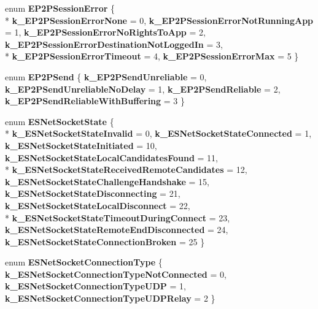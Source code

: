 \begin{DoxyCompactItemize}
\item 
\hypertarget{namespaceValve_1_1Steamworks_a993c473f27d237706a0af622b39f6b25}{}enum {\bfseries E\+P2\+P\+Session\+Error} \{ \\*
{\bfseries k\+\_\+\+E\+P2\+P\+Session\+Error\+None} = 0, 
{\bfseries k\+\_\+\+E\+P2\+P\+Session\+Error\+Not\+Running\+App} = 1, 
{\bfseries k\+\_\+\+E\+P2\+P\+Session\+Error\+No\+Rights\+To\+App} = 2, 
{\bfseries k\+\_\+\+E\+P2\+P\+Session\+Error\+Destination\+Not\+Logged\+In} = 3, 
\\*
{\bfseries k\+\_\+\+E\+P2\+P\+Session\+Error\+Timeout} = 4, 
{\bfseries k\+\_\+\+E\+P2\+P\+Session\+Error\+Max} = 5
 \}\label{namespaceValve_1_1Steamworks_a993c473f27d237706a0af622b39f6b25}

\item 
\hypertarget{namespaceValve_1_1Steamworks_afaf52a3fe3edfcee923d94dedba17814}{}enum {\bfseries E\+P2\+P\+Send} \{ {\bfseries k\+\_\+\+E\+P2\+P\+Send\+Unreliable} = 0, 
{\bfseries k\+\_\+\+E\+P2\+P\+Send\+Unreliable\+No\+Delay} = 1, 
{\bfseries k\+\_\+\+E\+P2\+P\+Send\+Reliable} = 2, 
{\bfseries k\+\_\+\+E\+P2\+P\+Send\+Reliable\+With\+Buffering} = 3
 \}\label{namespaceValve_1_1Steamworks_afaf52a3fe3edfcee923d94dedba17814}

\item 
\hypertarget{namespaceValve_1_1Steamworks_af62412d4d3fdfebc402e5dd992497d51}{}enum {\bfseries E\+S\+Net\+Socket\+State} \{ \\*
{\bfseries k\+\_\+\+E\+S\+Net\+Socket\+State\+Invalid} = 0, 
{\bfseries k\+\_\+\+E\+S\+Net\+Socket\+State\+Connected} = 1, 
{\bfseries k\+\_\+\+E\+S\+Net\+Socket\+State\+Initiated} = 10, 
{\bfseries k\+\_\+\+E\+S\+Net\+Socket\+State\+Local\+Candidates\+Found} = 11, 
\\*
{\bfseries k\+\_\+\+E\+S\+Net\+Socket\+State\+Received\+Remote\+Candidates} = 12, 
{\bfseries k\+\_\+\+E\+S\+Net\+Socket\+State\+Challenge\+Handshake} = 15, 
{\bfseries k\+\_\+\+E\+S\+Net\+Socket\+State\+Disconnecting} = 21, 
{\bfseries k\+\_\+\+E\+S\+Net\+Socket\+State\+Local\+Disconnect} = 22, 
\\*
{\bfseries k\+\_\+\+E\+S\+Net\+Socket\+State\+Timeout\+During\+Connect} = 23, 
{\bfseries k\+\_\+\+E\+S\+Net\+Socket\+State\+Remote\+End\+Disconnected} = 24, 
{\bfseries k\+\_\+\+E\+S\+Net\+Socket\+State\+Connection\+Broken} = 25
 \}\label{namespaceValve_1_1Steamworks_af62412d4d3fdfebc402e5dd992497d51}

\item 
\hypertarget{namespaceValve_1_1Steamworks_ab4b13623fc1bd48b8e9dcfae3fc35109}{}enum {\bfseries E\+S\+Net\+Socket\+Connection\+Type} \{ {\bfseries k\+\_\+\+E\+S\+Net\+Socket\+Connection\+Type\+Not\+Connected} = 0, 
{\bfseries k\+\_\+\+E\+S\+Net\+Socket\+Connection\+Type\+U\+D\+P} = 1, 
{\bfseries k\+\_\+\+E\+S\+Net\+Socket\+Connection\+Type\+U\+D\+P\+Relay} = 2
 \}\label{namespaceValve_1_1Steamworks_ab4b13623fc1bd48b8e9dcfae3fc35109}


\end{DoxyCompactItemize}
